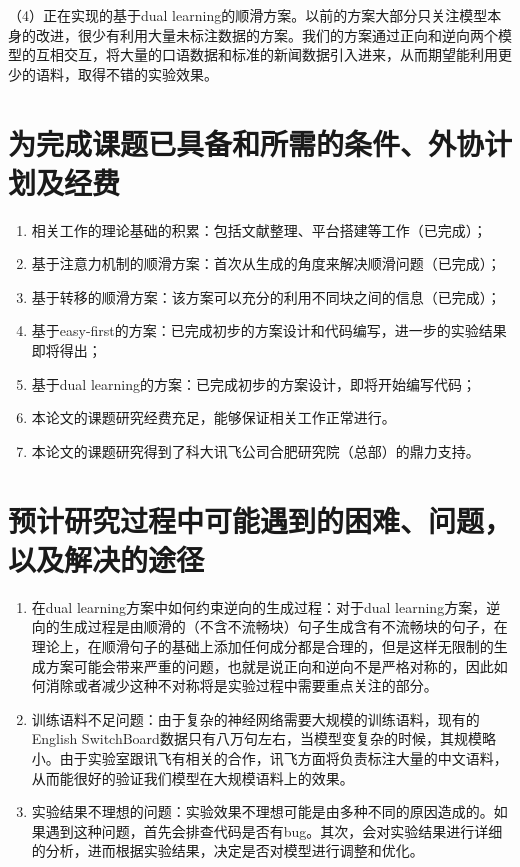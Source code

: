 （4）正在实现的基于dual learning的顺滑方案。以前的方案大部分只关注模型本身的改进，很少有利用大量未标注数据的方案。我们的方案通过正向和逆向两个模型的互相交互，将大量的口语数据和标准的新闻数据引入进来，从而期望能利用更少的语料，取得不错的实验效果。


\section{为完成课题已具备和所需的条件、外协计划及经费}
\begin{enumerate}
	\item 相关工作的理论基础的积累：包括文献整理、平台搭建等工作（已完成）；
	\item 基于注意力机制的顺滑方案：首次从生成的角度来解决顺滑问题（已完成）；
	\item 基于转移的顺滑方案：该方案可以充分的利用不同块之间的信息（已完成）；
	\item 基于easy-first的方案：已完成初步的方案设计和代码编写，进一步的实验结果即将得出；
	\item 基于dual learning的方案：已完成初步的方案设计，即将开始编写代码；
	\item 本论文的课题研究经费充足，能够保证相关工作正常进行。
	\item 本论文的课题研究得到了科大讯飞公司合肥研究院（总部）的鼎力支持。
\end{enumerate}


\section{预计研究过程中可能遇到的困难、问题，以及解决的途径}

\begin{enumerate}
	\item 在dual learning方案中如何约束逆向的生成过程：对于dual learning方案，逆向的生成过程是由顺滑的（不含不流畅块）句子生成含有不流畅块的句子，在理论上，在顺滑句子的基础上添加任何成分都是合理的，但是这样无限制的生成方案可能会带来严重的问题，也就是说正向和逆向不是严格对称的，因此如何消除或者减少这种不对称将是实验过程中需要重点关注的部分。
	\item 训练语料不足问题：由于复杂的神经网络需要大规模的训练语料，现有的English SwitchBoard数据只有八万句左右，当模型变复杂的时候，其规模略小。由于实验室跟讯飞有相关的合作，讯飞方面将负责标注大量的中文语料，从而能很好的验证我们模型在大规模语料上的效果。
	\item 实验结果不理想的问题：实验效果不理想可能是由多种不同的原因造成的。如果遇到这种问题，首先会排查代码是否有bug。其次，会对实验结果进行详细的分析，进而根据实验结果，决定是否对模型进行调整和优化。
\end{enumerate}

